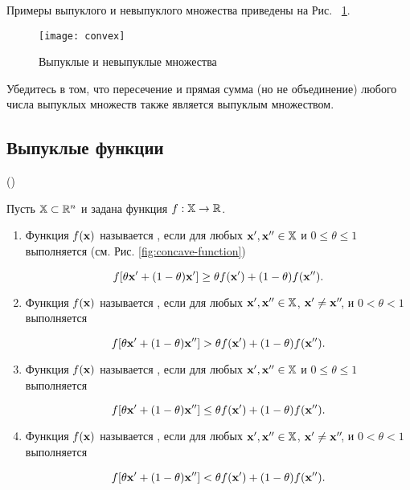 Примеры выпуклого и невыпуклого множества приведены на Рис.~
\ref{fig:nonconvex}.

\begin{figure} \centering
\texttt{[image: convex]}
\caption{Выпуклые и невыпуклые множества \cite{Gale:1963}}
\label{fig:nonconvex}
\end{figure}

\begin{exer}
Убедитесь в том, что пересечение и прямая сумма (но не объединение)
любого числа выпуклых множеств также является выпуклым множеством.
\end{exer}

\subsection{Выпуклые функции}

\begin{dfn}(\cite{Takayama:1985})

Пусть $\mathbb{X} \subset \mathbb{R}^n$ и задана функция $f : \mathbb{X} \to \mathbb{R}$.

\begin{enumerate}
\renewcommand{\theenumi}{(\asbuk{enumi})}

  \item Функция $f(\mathbf{x})$ называется ,
если для любых $\mathbf{x}', \mathbf{x}'' \in \mathbb{X}$ и $0 \leq \theta \leq
1$ выполняется (см. Рис. \ref{fig:concave-function})

\[
f[\theta \mathbf{x}' + (1-\theta)\mathbf{x}'] \geq \theta f(\mathbf{x}') +
(1-\theta)f(\mathbf{x}'').
\]

  \item Функция $f(\mathbf{x})$ называется ,
если для любых $\mathbf{x}', \mathbf{x}'' \in \mathbb{X}$, $\mathbf{x}' \neq
\mathbf{x}''\!$, и $0 < \theta < 1$ выполняется

\[
f[\theta \mathbf{x}' + (1-\theta)\mathbf{x}''] > \theta f(\mathbf{x}') +
(1-\theta)f(\mathbf{x}'').
\]

  \item Функция $f(\mathbf{x})$ называется ,
если для любых $\mathbf{x}', \mathbf{x}'' \in \mathbb{X}$ и $0 \leq \theta \leq
1$ выполняется

\[
f[\theta \mathbf{x}' + (1-\theta)\mathbf{x}''] \leq \theta f(\mathbf{x}') +
(1-\theta)f(\mathbf{x}'').
\]

\item Функция $f(\mathbf{x})$ называется ,
если для любых $\mathbf{x}', \mathbf{x}'' \in \mathbb{X}$, $\mathbf{x}' \neq
\mathbf{x}''\!$, и $0 < \theta < 1$ выполняется

\[
f[\theta \mathbf{x}' + (1-\theta)\mathbf{x}''] < \theta f(\mathbf{x}') +
(1-\theta)f(\mathbf{x}'').
\]

\end{enumerate}
\end{dfn}



